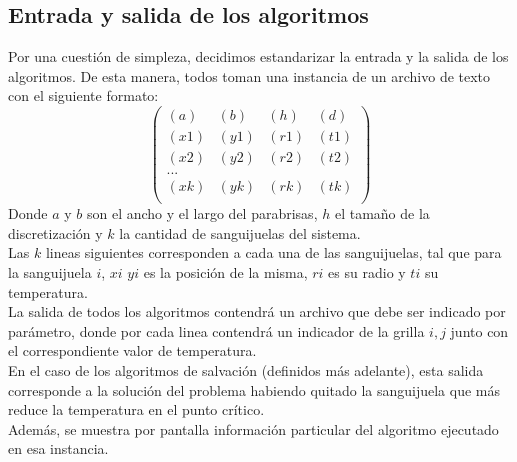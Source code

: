 \subsection{Entrada y salida de los algoritmos}

Por una cuestión de simpleza, decidimos estandarizar la entrada y la salida de los algoritmos. De esta manera, todos toman una instancia de un archivo de texto con el siguiente formato:
$$
\begin{pmatrix}
 (a) & (b) & (h) & (d) \\
 (x1) & (y1) & (r1) & (t1) \\
 (x2) & (y2) & (r2) & (t2) \\
...\\
 (xk) & (yk) & (rk) & (tk) \\
\end{pmatrix}
$$
Donde $a$ y $b$ son el ancho y el largo del parabrisas, $h$ el tamaño de la discretización y $k$ la cantidad de sanguijuelas del sistema.
\\
Las $k$ lineas siguientes corresponden a cada una de las sanguijuelas, tal que para la sanguijuela $i$, $xi$ $yi$ es la posición de la misma, $ri$ es su radio y $ti$ su temperatura.
\\
La salida de todos los algoritmos contendrá un archivo que debe ser indicado por parámetro, donde por cada linea contendrá un indicador de la grilla $i,j$ junto con el correspondiente valor de temperatura.
\\
En el caso de los algoritmos de salvación (definidos más adelante), esta salida corresponde a la solución del problema habiendo quitado la sanguijuela que más reduce la temperatura en el punto crítico.
\\
Además, se muestra por pantalla información particular del algoritmo ejecutado en esa instancia.
